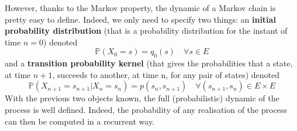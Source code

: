However, thanks to the Markov property, the dynamic of a Markov chain is pretty easy to define. Indeed, we only need to specify two things: an \textbf{initial probability distribution} (that is a probability distribution for the instant of time $n=0$) denoted
\begin{equation}\mathbb{P}\left(X_{0}=s\right)=q_{0}(s) \quad \forall s \in E\end{equation}
and a \textbf{transition probability kernel} (that gives the probabilities that a state, at time $n+1$, succeeds to another, at time n, for any pair of states) denoted
\begin{equation}\mathbb{P}\left(X_{n+1}=s_{n+1} | X_{n}=s_{n}\right)=p\left(s_{n}, s_{n+1}\right) \quad \forall\left(s_{n+1}, s_{n}\right) \in E \times E\end{equation}
With the previous two objects known, the full (probabilistic) dynamic of the process is well defined. Indeed, the probability of any realisation of the process can then be computed in a recurrent way.

